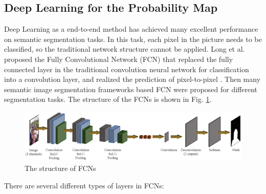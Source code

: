 \subsection{Deep Learning for the Probability Map}\label{subsec: FCNs for the Probability Map}
Deep Learning as a end-to-end method has achieved many excellent performance on semantic segmentation tasks. In this task, each pixel in the picture needs to be classified, so the traditional network structure cannot be applied. Long et al. proposed the Fully Convolutional Network (FCN) that replaced the fully connected layer in the traditional convolution neural network for classification into a convolution layer, and realized the prediction of pixel-to-pixel \cite{FCN-original:long2015fully}. Then many semantic image segmentation frameworks based FCN were proposed for different segmentation tasks. The structure of the FCNs is shown in Fig. \ref{fig: The structure of FCNs}.
\begin{figure}[t]
    \centering
    \includegraphics[width = 15cm]{figs/FCN.eps}
    \caption{The structure of FCNs}\label{fig: The structure of FCNs}
\end{figure}
There are several different types of layers in FCNs:

